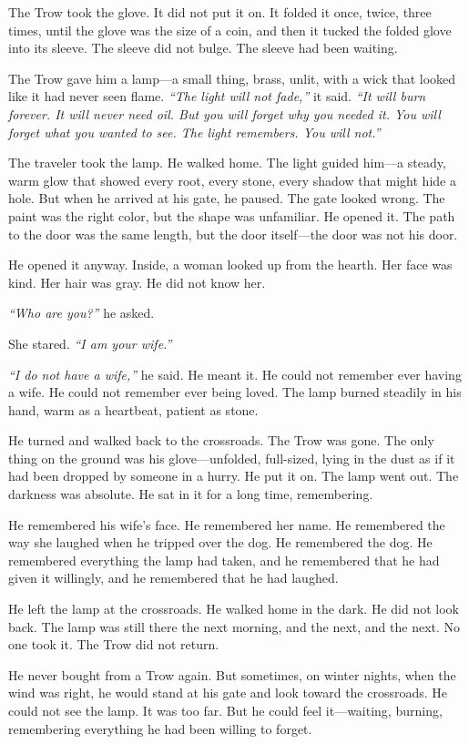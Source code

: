 The Trow took the glove. It did not put it on. It folded it once, twice, three times, until the glove was the size of a coin, and then it tucked the folded glove into its sleeve. The sleeve did not bulge. The sleeve had been waiting.

The Trow gave him a lamp---a small thing, brass, unlit, with a wick that looked like it had never seen flame. \textit{``The light will not fade,''} it said. \textit{``It will burn forever. It will never need oil. But you will forget why you needed it. You will forget what you wanted to see. The light remembers. You will not.''}

The traveler took the lamp. He walked home. The light guided him---a steady, warm glow that showed every root, every stone, every shadow that might hide a hole. But when he arrived at his gate, he paused. The gate looked wrong. The paint was the right color, but the shape was unfamiliar. He opened it. The path to the door was the same length, but the door itself---the door was not his door.

He opened it anyway. Inside, a woman looked up from the hearth. Her face was kind. Her hair was gray. He did not know her.

\textit{``Who are you?''} he asked.

She stared. \textit{``I am your wife.''}

\textit{``I do not have a wife,''} he said. He meant it. He could not remember ever having a wife. He could not remember ever being loved. The lamp burned steadily in his hand, warm as a heartbeat, patient as stone.

He turned and walked back to the crossroads. The Trow was gone. The only thing on the ground was his glove---unfolded, full-sized, lying in the dust as if it had been dropped by someone in a hurry. He put it on. The lamp went out. The darkness was absolute. He sat in it for a long time, remembering.

He remembered his wife's face. He remembered her name. He remembered the way she laughed when he tripped over the dog. He remembered the dog. He remembered everything the lamp had taken, and he remembered that he had given it willingly, and he remembered that he had laughed.

He left the lamp at the crossroads. He walked home in the dark. He did not look back. The lamp was still there the next morning, and the next, and the next. No one took it. The Trow did not return.

He never bought from a Trow again. But sometimes, on winter nights, when the wind was right, he would stand at his gate and look toward the crossroads. He could not see the lamp. It was too far. But he could feel it---waiting, burning, remembering everything he had been willing to forget.

